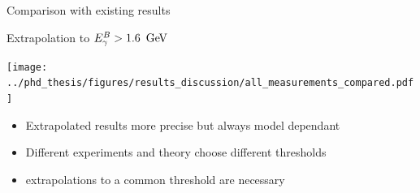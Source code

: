 \documentclass[xcolor=dvipsnames]{beamer}
\begin{document}
\begin{frame}{Comparison with existing results}
\centering\scriptsize

Extrapolation to ${E^B_{\gamma}}>1.6~\mathrm{\,Ge\kern -0.1em V}$ 

      \texttt{[image: ../phd\_thesis/figures/results\_discussion/all\_measurements\_compared.pdf]}

      \begin{itemize}
         \item Extrapolated results more precise but always model dependant
         \item Different experiments and theory choose different thresholds
         \item[\ra] extrapolations to a common threshold are necessary
      \end{itemize}
      
\end{frame}
\end{document}

